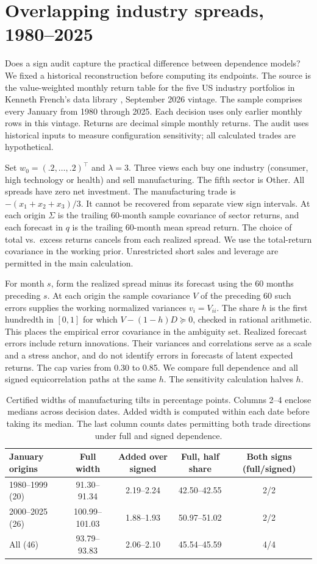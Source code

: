 \section{Overlapping industry spreads, 1980--2025}
Does a sign audit capture the practical difference between dependence models? We fixed a historical reconstruction before computing its endpoints. The source is the value-weighted monthly return table for the five US industry portfolios in Kenneth French's data library \cite{french}, September 2026 vintage. The sample comprises every January from 1980 through 2025. Each decision uses only earlier monthly rows in this vintage. Returns are decimal simple monthly returns. The audit uses historical inputs to measure configuration sensitivity; all calculated trades are hypothetical.

Set $w_0=(.2,\ldots,.2)^\top$ and $\lambda=3$. Three views each buy one industry (consumer, high technology or health) and sell manufacturing. The fifth sector is Other. All spreads have zero net investment. The manufacturing trade is $-(x_1+x_2+x_3)/3$. It cannot be recovered from separate view sign intervals. At each origin $\Sigma$ is the trailing 60-month sample covariance of sector returns, and each forecast in $q$ is the trailing 60-month mean spread return. The choice of total vs.\ excess returns cancels from each realized spread. We use the total-return covariance in the working prior. Unrestricted short sales and leverage are permitted in the main calculation.

For month $s$, form the realized spread minus its forecast using the 60 months preceding $s$. At each origin the sample covariance $V$ of the preceding 60 such errors supplies the working normalized variances $v_i=V_{ii}$. The share $h$ is the first hundredth in $[0,1]$ for which $V-(1-h)D\succeq0$, checked in rational arithmetic. This places the empirical error covariance in the ambiguity set. Realized forecast errors include return innovations. Their variances and correlations serve as a scale and a stress anchor, and do not identify errors in forecasts of latent expected returns. The cap varies from 0.30 to 0.85. We compare full dependence and all signed equicorrelation paths at the same $h$. The sensitivity calculation halves $h$.

\begin{table}[ht]
\centering\small
\caption{Certified widths of manufacturing tilts in percentage points. Columns 2--4 enclose medians across decision dates. Added width is computed within each date before taking its median. The last column counts dates permitting both trade directions under full and signed dependence.}
\begin{tabular}{lcccc}\toprule
January origins & Full width & Added over signed & Full, half share & Both signs (full/signed)\\\midrule
1980--1999 (20)&91.30--91.34&2.19--2.24&42.50--42.55&2/2\\
2000--2025 (26)&100.99--101.03&1.88--1.93&50.97--51.02&2/2\\
All (46)&93.79--93.83&2.06--2.10&45.54--45.59&4/4\\\bottomrule
\end{tabular}
\end{table}

